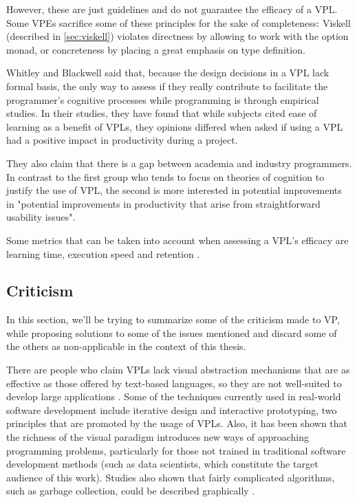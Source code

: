 \begin{itemsize}
However, these are just guidelines and do not guarantee the efficacy of a VPL.
Some VPEs sacrifice some of these principles for the sake of completeness:
Viskell (described in \ref{sec:viskell}) violates directness by allowing to
work with the option monad, or concreteness by placing a great emphasis on type
definition.

Whitley and Blackwell \cite{Whitley1997} said that, because the design decisions
in a VPL lack formal basis, the only way to assess if they really contribute
to facilitate the programmer's cognitive processes while programming is through
empirical studies. In their studies, they have found that while subjects
cited ease of learning as a benefit of VPLs, they opinions differed when asked
if using a VPL had a positive impact in productivity during a project.

They also claim that there is a gap between academia and industry programmers.
In contrast to the first group who tends to focus on theories of cognition to justify the use
of VPL, the second is more interested in potential improvements in "potential
improvements in productivity that arise from straightforward usability issues".

Some metrics that can be taken into account when assessing a VPL's efficacy
are learning time, execution speed and retention \cite{Myers1990}.

\subsection{Criticism}
\label{sec:crit}

In this section, we'll be trying to summarize some of the criticism made to VP,
while proposing solutions to some of the issues mentioned and discard some of
the others as non-applicable in the context of this thesis.

There are people who claim VPLs lack visual abstraction mechanisms that are as effective
as those offered by text-based languages, so they are not well-suited to develop
large applications \cite{JamalRahmanandWenzel2014}. Some of the techniques
currently used in real-world software development include iterative design and
interactive prototyping, two principles that are promoted by the usage of VPLs.
Also, it has been shown that the richness of the visual paradigm
introduces new ways of approaching programming problems, particularly for
those not trained in traditional software development methods \cite{JamalRahmanandWenzel2014}
(such as data scientists, which constitute the target audience of this work).
Studies also shown that fairly complicated algorithms, such as garbage collection,
could be described graphically \cite{Myers1990}.


\end{itemsize}
